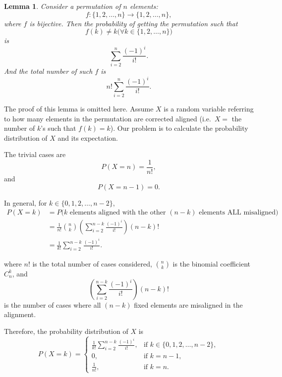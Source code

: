 \documentclass[11pt,a4paper]{article}
\newtheorem{lemma}{Lemma}
\begin{document}
\newcommand{\EditionName}{Reproduced English edition}
\newcommand{\EditionSummary}{%
  This edition preserves the text and calculation visible in the source
  video as closely as the available frames permit.}


\begin{lemma}
Consider a permutation of \(n\) elements:
\[
  f:\{1,2,\ldots,n\}\longrightarrow\{1,2,\ldots,n\},
\]
where \(f\) is bijective. Then the probability of getting the permutation such
that
\[
  f(k)\ne k\bigl(\forall k\in\{1,2,\ldots,n\}\bigr)
\]
is
\[
  \sum_{i=2}^{n}\frac{(-1)^i}{i!}.
\]
And the total number of such \(f\) is
\[
  n!\sum_{i=2}^{n}\frac{(-1)^i}{i!}.
\]
\end{lemma}

The proof of this lemma is omitted here. Assume \(X\) is a random variable
referring to how many elements in the permutation are corrected aligned
(i.e.\ \(X=\) the number of \(k\)'s such that \(f(k)=k\)). Our problem is to
calculate the probability distribution of \(X\) and its expectation.

\newpage

The trivial cases are
\[
  P(X=n)=\frac{1}{n!},
\]
and
\[
  P(X=n-1)=0.
\]

In general, for \(k\in\{0,1,2,\ldots,n-2\}\),
\begin{align*}
  P(X=k)
    &=P\bigl(k\text{ elements aligned with the other }(n-k)
      \text{ elements ALL misaligned}\bigr)\\
    &=\frac{1}{n!}\binom{n}{k}
      \left(\sum_{i=2}^{n-k}\frac{(-1)^i}{i!}\right)(n-k)!\\
    &=\frac{1}{k!}\sum_{i=2}^{n-k}\frac{(-1)^i}{i!}.
\end{align*}

where \(n!\) is the total number of cases considered, \(\binom{n}{k}\) is the
binomial coefficient \(C_n^k\), and
\[
  \left(\sum_{i=2}^{n-k}\frac{(-1)^i}{i!}\right)(n-k)!
\]
is the number of cases where all \((n-k)\) fixed elements are misaligned in
the alignment.

Therefore, the probability distribution of \(X\) is
\[
  P(X=k)=
  \begin{cases}
    \displaystyle\frac{1}{k!}\sum_{i=2}^{n-k}\frac{(-1)^i}{i!},
      & \text{if }k\in\{0,1,2,\ldots,n-2\},\\[1.1em]
    0, & \text{if }k=n-1,\\[0.25em]
    \displaystyle\frac{1}{n!}, & \text{if }k=n.
  \end{cases}
\]
\end{document}
